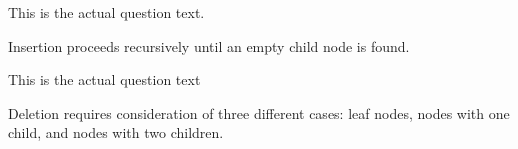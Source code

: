 \documentclass[solutions]{exampaper}
\begin{document}
\maketitle

This is the actual question text.
\begin{answer} 
Insertion proceeds recursively until an empty child node is found. 
\end{answer} 
This is the actual question text
\begin{answer}
Deletion requires consideration of three different cases: leaf nodes, nodes with one child, and nodes with two children. 
\end{answer}
\end{document}
